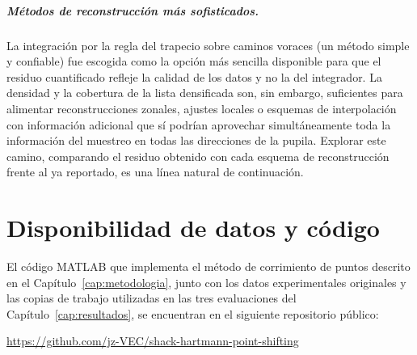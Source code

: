 \documentclass[letterpaper,12pt,oneside]{book}
\begin{document}
\paragraph{Métodos de reconstrucción más sofisticados.} La integración por la regla del
trapecio sobre caminos voraces (un método simple y confiable) fue escogida como la opción
más sencilla disponible para que el residuo cuantificado refleje la calidad de los datos y
no la del integrador. La densidad y la cobertura de la lista densificada son, sin embargo,
suficientes para alimentar reconstrucciones zonales, ajustes locales o esquemas de
interpolación con información adicional que sí podrían aprovechar simultáneamente toda la
información del muestreo en todas las direcciones de la pupila. Explorar este camino,
comparando el residuo obtenido con cada esquema de reconstrucción frente al ya reportado,
es una línea natural de continuación.

\appendix

\chapter{Disponibilidad de datos y código}\label{ap:disponibilidad}

El código MATLAB que implementa el método de corrimiento de puntos descrito en el
Capítulo~\ref{cap:metodologia}, junto con los datos experimentales originales y las
copias de trabajo utilizadas en las tres evaluaciones del
Capítulo~\ref{cap:resultados}, se encuentran en el siguiente repositorio público:

\begin{center}
\url{https://github.com/jz-VEC/shack-hartmann-point-shifting}
\end{center}
\end{document}

